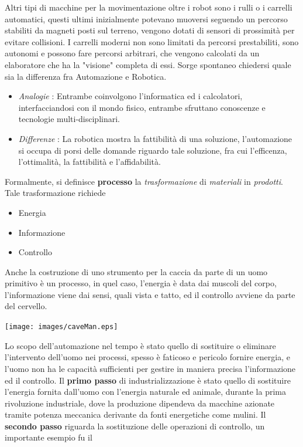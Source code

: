 \documentclass[10pt, letterpaper]{report}
\begin{document}
Altri tipi di macchine per la movimentazione oltre i robot sono i rulli o i carrelli automatici, questi ultimi 
inizialmente potevano muoversi seguendo un percorso stabiliti da magneti posti sul terreno, vengono dotati di 
sensori di prossimità per evitare collisioni. I carrelli moderni non sono limitati da percorsi prestabiliti, sono 
autonomi e possono fare percorsi arbitrari, che vengono calcolati da un elaboratore che ha la "visione" completa 
di essi.\acc 
Sorge spontaneo chiedersi quale sia la differenza fra Automazione e Robotica.\begin{itemize}
    \item \textit{Analogie} : Entrambe coinvolgono l'informatica ed i calcolatori, interfacciandosi con il mondo 
    fisico, entrambe sfruttano conoscenze e tecnologie multi-disciplinari. 
    \item \textit{Differenze} : La robotica mostra la fattibilità di una soluzione, l'automazione si occupa di 
    porsi delle domande riguardo tale soluzione, fra cui l'efficenza, l'ottimalità, la fattibilità e l'affidabilità.
\end{itemize}
Formalmente, si definisce \textbf{processo} la \textit{trasformazione} di \textit{materiali} in 
\textit{prodotti}. Tale trasformazione richiede 
\begin{itemize}
    \item Energia 
    \item Informazione 
    \item Controllo
\end{itemize}
Anche la costruzione di uno strumento per la caccia da parte di un uomo primitivo è un processo, in quel caso, 
l'energia è data dai muscoli del corpo, l'informazione viene dai sensi, quali vista e tatto, ed il controllo 
avviene da parte del cervello.
\begin{center}
    \texttt{[image: images/caveMan.eps]}
\end{center}
Lo scopo dell'automazione nel tempo è stato quello di sostituire o eliminare l'intervento dell'uomo 
nei processi, spesso è faticoso e pericolo fornire energia, e l'uomo non ha le capacità sufficienti per 
gestire in maniera precisa l'informazione ed il controllo.\acc 
Il \textbf{primo passo} di industrializzazione è stato quello di sostituire l'energia fornita dall'uomo con l'energia 
naturale ed animale, durante la prima rivoluzione industriale, dove la produzione dipendeva da macchine 
azionate tramite potenza meccanica derivante da fonti energetiche come mulini.\acc 
Il \textbf{secondo passo} riguarda la sostituzione delle operazioni di controllo, un importante esempio fu il 
\end{document}

